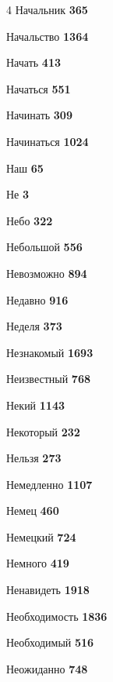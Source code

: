 \begin{multicols}{4}
\noindent Начальник \dotfill \textbf{\color{secondary} 365}\par
\noindent Начальство \dotfill \textbf{\color{secondary} 1364}\par
\noindent Начать \dotfill \textbf{\color{secondary} 413}\par
\noindent Начаться \dotfill \textbf{\color{secondary} 551}\par
\noindent Начинать \dotfill \textbf{\color{secondary} 309}\par
\noindent Начинаться \dotfill \textbf{\color{secondary} 1024}\par
\noindent Наш \dotfill \textbf{\color{secondary} 65}\par
\noindent Не \dotfill \textbf{\color{secondary} 3}\par
\noindent Небо \dotfill \textbf{\color{secondary} 322}\par
\noindent Небольшой \dotfill \textbf{\color{secondary} 556}\par
\noindent Невозможно \dotfill \textbf{\color{secondary} 894}\par
\noindent Недавно \dotfill \textbf{\color{secondary} 916}\par
\noindent Неделя \dotfill \textbf{\color{secondary} 373}\par
\noindent Незнакомый \dotfill \textbf{\color{secondary} 1693}\par
\noindent Неизвестный \dotfill \textbf{\color{secondary} 768}\par
\noindent Некий \dotfill \textbf{\color{secondary} 1143}\par
\noindent Некоторый \dotfill \textbf{\color{secondary} 232}\par
\noindent Нельзя \dotfill \textbf{\color{secondary} 273}\par
\noindent Немедленно \dotfill \textbf{\color{secondary} 1107}\par
\noindent Немец \dotfill \textbf{\color{secondary} 460}\par
\noindent Немецкий \dotfill \textbf{\color{secondary} 724}\par
\noindent Немного \dotfill \textbf{\color{secondary} 419}\par
\noindent Ненавидеть \dotfill \textbf{\color{secondary} 1918}\par
\noindent Необходимость \dotfill \textbf{\color{secondary} 1836}\par
\noindent Необходимый \dotfill \textbf{\color{secondary} 516}\par
\noindent Неожиданно \dotfill \textbf{\color{secondary} 748}\par

\end{multicols}
